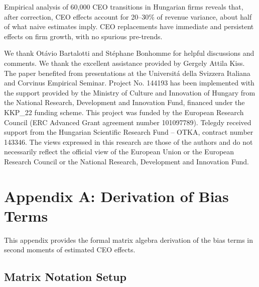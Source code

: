 \documentclass[sigconf,nonacm]{acmart}
\begin{document}
Empirical analysis of 60,000 CEO transitions in Hungarian firms reveals that, after correction, CEO effects account for 20–30\% of revenue variance, about half of what naive estimates imply. CEO replacements have immediate and persistent effects on firm growth, with no spurious pre-trends. 
\begin{acks}
We thank Ot\'{a}vio Bartalotti and St\'ephane Bonhomme for helpful discussions and comments.  We thank the excellent assistance provided by Gergely Attila Kiss. The paper benefited from presentations at the Universit\'a della Svizzera Italiana and Corvinus Empirical Seminar. Project No. 144193 has been implemented with the support provided by the Ministry of Culture and Innovation of Hungary from the National Research, Development and Innovation Fund, financed under the KKP\_22 funding scheme. This project was funded by the European Research Council (ERC Advanced Grant agreement number 101097789). Telegdy received support from the Hungarian Scientific Research Fund – OTKA, contract number 143346. The views expressed in this research are those of the authors and do not necessarily reflect the official view of the European Union or the European Research Council or the National Research, Development and Innovation Fund.
\end{acks}

\clearpage 


%

\clearpage


 











\section*{Appendix A: Derivation of Bias Terms}\label{sec: appA}

\setcounter{equation}{0}
\renewcommand{\theequation}{A\arabic{equation}}

This appendix provides the formal matrix algebra derivation of the bias terms in second moments of estimated CEO effects.

\subsection{Matrix Notation Setup}
\end{document}
